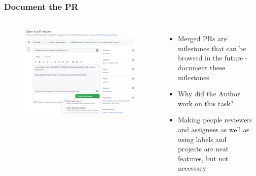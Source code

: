 \documentclass[aspectratio=169]{beamer} %
\begin{document}
\begin{frame}
	\frametitle{Document the PR}
	\begin{columns}[c]
		
		\vspace{-.25cm}
		\begin{figure}
			\centering
			\includegraphics[width=\textwidth]{./img/create-pr-1.png}
		\end{figure}
		
		\begin{itemize}
			\setlength\itemsep{1.5em}
			\item Merged PRs are milestones that can be browsed in the future - 
			document these milestones
			\item Why did the Author work on this task?
			\item Making people reviewers and assignees as well as 
			using labels and projects are neat features, but not necessary 
		\end{itemize}
		
	\end{columns}
\end{frame}
\end{document}
